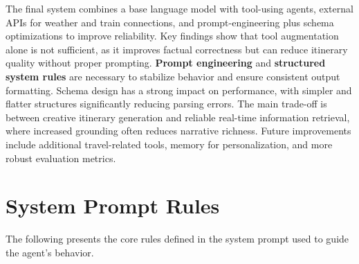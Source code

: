 \documentclass[fleqn,moreauthors,10pt]{ds_report}
\begin{document}

The final system combines a base language model with tool-using agents, external APIs for weather and train connections, and prompt-engineering plus schema optimizations to improve reliability. Key findings show that tool augmentation alone is not sufficient, as it improves factual correctness but can reduce itinerary quality without proper prompting. \textbf{Prompt engineering} and \textbf{structured system rules} are necessary to stabilize behavior and ensure consistent output formatting. Schema design has a strong impact on performance, with simpler and flatter structures significantly reducing parsing errors. The main trade-off is between creative itinerary generation and reliable real-time information retrieval, where increased grounding often reduces narrative richness. Future improvements include additional travel-related tools, memory for personalization, and more robust evaluation metrics.








\appendix

\section{System Prompt Rules}
\label{app:system-prompt}

The following presents the core rules defined in the system prompt used to guide the agent's behavior.
\end{document}
